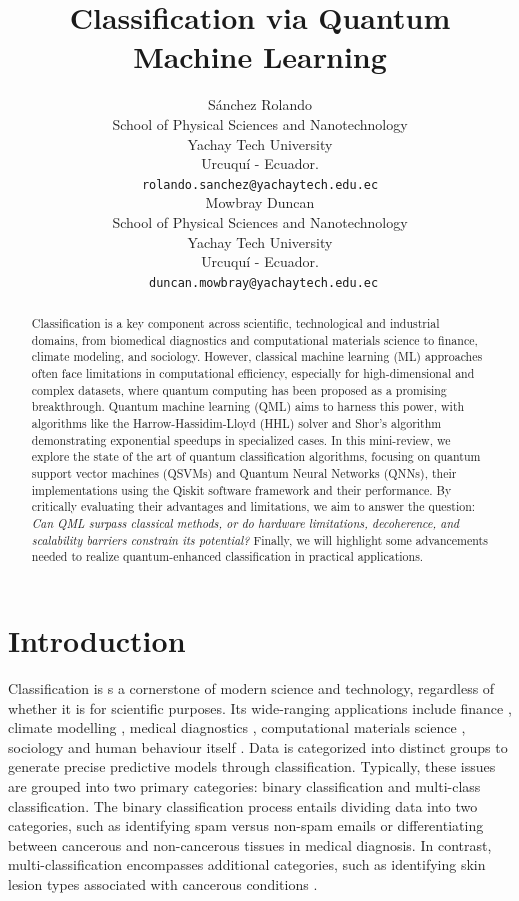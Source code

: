 \documentclass{article}
\title{Classification via Quantum Machine Learning} %
\author{
 Sánchez Rolando \\
 School of Physical Sciences and Nanotechnology\\
 Yachay Tech University\\
 Urcuquí - Ecuador. \\
 \texttt{rolando.sanchez@yachaytech.edu.ec} \\
 \And
 Mowbray Duncan \\
 School of Physical Sciences and Nanotechnology\\
 Yachay Tech University\\
 Urcuquí - Ecuador. \\
 \texttt{	duncan.mowbray@yachaytech.edu.ec} \\
}
\begin{document}
\maketitle
\begin{abstract}
Classification is a key component across scientific, technological and industrial domains, from biomedical diagnostics and computational materials science to finance, climate modeling, 
and sociology. However, classical machine learning (ML) approaches often face limitations in computational efficiency, especially for high-dimensional and complex datasets, where quantum 
computing has been proposed as a promising breakthrough.  Quantum machine learning (QML) aims to harness this power, with algorithms like the Harrow-Hassidim-Lloyd (HHL) solver and 
Shor's algorithm demonstrating exponential speedups in specialized cases. 
In this mini-review, we explore the state of the art of quantum classification algorithms, focusing on quantum support vector machines (QSVMs) and Quantum Neural Networks (QNNs), 
their implementations using the Qiskit software framework and their performance. By critically evaluating their advantages and limitations, we aim to answer the question:
\textit{Can QML surpass classical methods, or do hardware limitations, decoherence, and scalability barriers constrain its potential?} 
Finally, we will highlight some advancements needed to realize quantum-enhanced classification in practical applications.
\end{abstract}


\section{Introduction}
Classification is s a cornerstone of modern science and technology, regardless of whether it is for scientific purposes. 
Its wide-ranging applications include finance \cite{SMAILOVIC2014181}, climate modelling \cite{gmd-16-6433-2023}, medical diagnostics \cite{doi:10.1148/rg.2017160130}, computational materials science \cite{LIU2017159}, sociology \cite{Franco2021} and human behaviour itself \cite{Richards2019}. 
Data is categorized into distinct groups to generate precise predictive models through classification. 
Typically, these issues are grouped into two primary categories: binary classification and multi-class classification. 
The binary classification process entails dividing data into two categories, such as identifying spam versus non-spam emails or differentiating between 
cancerous and non-cancerous tissues in medical diagnosis.
In contrast, multi-classification encompasses additional categories, such as identifying skin lesion types associated with cancerous conditions \cite{10613907}.
\end{document}
